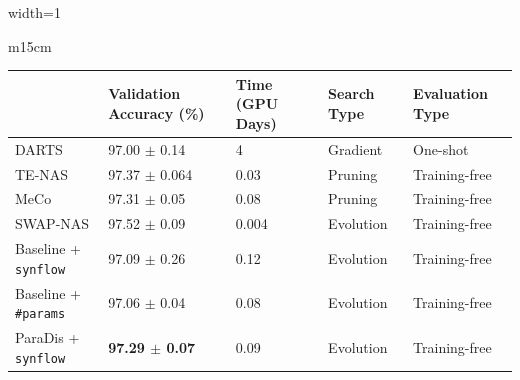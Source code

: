 \documentclass[]{standalone}
\begin{document}
\begin{adjustbox}{width=1\textwidth}

\begin{tabular}{m{15cm}}
\\
\begin{tabular}{m{5cm} | m{2.5cm} | m{1cm} | m{2cm} | m{2cm}}
    & Validation Accuracy (\%) & Time (GPU Days) & Search Type & Evaluation Type \\
    \hline

    DARTS & 97.00 $\pm$ 0.14 & 4 & Gradient & One-shot \\
    TE-NAS & 97.37 $\pm$ 0.064 & 0.03 & Pruning & Training-free \\
    MeCo & 97.31 $\pm$ 0.05 & 0.08 & Pruning & Training-free \\
    SWAP-NAS \dag & 97.52 $\pm$ 0.09 & 0.004 & Evolution & Training-free \\

    \hline

    Baseline + \texttt{synflow} & 97.09 $\pm$ 0.26 & 0.12 & Evolution & Training-free\\
    
    Baseline + \texttt{\#params} & 97.06 $\pm$ 0.04 & 0.08 & Evolution & Training-free\\

    ParaDis + \texttt{synflow} & \textbf{97.29 $\pm$ 0.07} & 0.09 & Evolution & Training-free\\
    
    \hline

\end{tabular}\\
\\
\\

\end{tabular}

\end{adjustbox}
\end{document}
